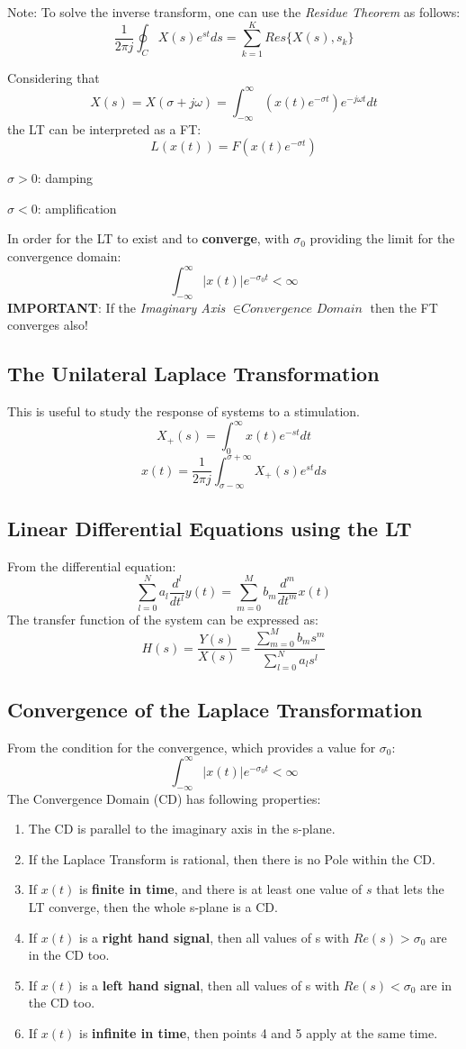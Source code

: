 \documentclass[10pt,a4paper]{article}
\begin{document}
Note: To solve the inverse transform, one can use the \emph{Residue Theorem} as follows:
$$
\frac{1}{2\pi j}\oint_C X(s)e^{st}ds = \sum_{k=1}^K Res\{X(s),s_k\}
$$


Considering that
$$
X(s) = X(\sigma+j\omega) = \int_{-\infty}^{\infty} (x(t)e^{-\sigma t})e^{-j\omega t}dt
$$
the LT can be interpreted as a FT:
$$
L(x(t)) = F(x(t)e^{-\sigma t})
$$
\begin{list}{•}{}
\item $\sigma > 0$: damping
\item $\sigma < 0$: amplification
\end{list}
In order for the LT to exist and to \textbf{converge}, with $\sigma_0$ providing the limit for the convergence domain: 
$$
\int_{-\infty}^{\infty} \vert x(t) \vert e^{-\sigma_0t} < \infty
$$
\textbf{IMPORTANT}: If the \emph{Imaginary Axis} $ \in \textit{Convergence Domain}$ then the FT converges also!

\subsection{The Unilateral Laplace Transformation}
This is useful to study the response of systems to a stimulation.
$$
X_+(s) = \int_{0}^{\infty} x(t)e^{-st}dt
$$
$$
x(t) = \frac{1}{2\pi j} \int_{\sigma-\infty}^{\sigma+\infty} X_+(s)e^{st}ds
$$
\subsection{Linear Differential Equations using the LT}
From the differential equation:
$$
\sum_{l=0}^{N} a_l \frac{d^l}{dt^l}y(t) = \sum_{m=0}^{M} b_m \frac{d^m}{dt^m}x(t) 
$$
The transfer function of the system can be expressed as:
$$
\boxed{
H(s) = \frac{Y(s)}{X(s)} = \frac{\sum_{m=0}^{M} b_m s^m}{\sum_{l=0}^{N} a_l s^l}
}
$$

\subsection{Convergence of the Laplace Transformation}
From the condition for the convergence, which provides a value for $\sigma_0$:
$$
\int_{-\infty}^{\infty} \vert x(t) \vert e^{-\sigma_0t} < \infty
$$
The Convergence Domain (CD) has following properties:
\begin{enumerate}
\item The CD is parallel to the imaginary axis in the s-plane.
\item If the Laplace Transform is rational, then there is no Pole within the CD.
\item If $x(t)$ is \textbf{finite in time}, and there is at least one value of $s$ that lets the LT converge, then the whole s-plane is a CD.
\item If $x(t)$ is a \textbf{right hand signal}, then all values of s with $Re(s) > \sigma_0$ are in the CD too. 
\item If $x(t)$ is a \textbf{left hand signal}, then all values of s with $Re(s) < \sigma_0$ are in the CD too. 
\item If $x(t)$ is \textbf{infinite in time}, then points 4 and 5 apply at the same time. 
\end{enumerate}
\end{document}
